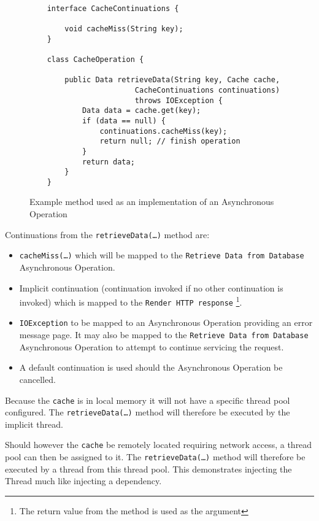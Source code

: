 \documentclass{article}
\begin{document}
\begin{figure}[!t]
\begin{verbatim}

    interface CacheContinuations {

        void cacheMiss(String key);
    }

    class CacheOperation {
    
        public Data retrieveData(String key, Cache cache, 
                        CacheContinuations continuations)
                        throws IOException {
        	Data data = cache.get(key);
        	if (data == null) {
        	    continuations.cacheMiss(key);
        	    return null; // finish operation
        	}
        	return data;
        }
    }
\end{verbatim}
\caption[Caption for Code]{Example method used as an implementation of an Asynchronous Operation}
\label{fig:Example_Method_Operation}
\end{figure}

Continuations from the \texttt{retrieveData(\ldots)} method are:
\begin{itemize}
  \item \texttt{cacheMiss(\ldots)} which will be mapped to the \texttt{Retrieve Data from Database} Asynchronous Operation.
  \item Implicit continuation (continuation invoked if no other continuation is invoked) which is mapped to the \texttt{Render HTTP response} \footnote{The return value from the method is used as the argument}.
  \item \texttt{IOException} to be mapped to an Asynchronous Operation providing an error message page.  It may also be mapped to the \texttt{Retrieve Data from Database} Asynchronous Operation to attempt to continue servicing the request.
  \item A default continuation is used should the Asynchronous Operation be cancelled.
\end{itemize}

Because the \texttt{cache} is in local memory it will not have a specific thread
pool configured.  The \texttt{retrieveData(\ldots)} method will therefore be
executed by the implicit thread.

Should however the \texttt{cache} be remotely located requiring network access,
a thread pool can then be assigned to it.  The \texttt{retrieveData(\ldots)}
method will therefore be executed by a thread from this thread pool.  This
demonstrates injecting the Thread much like injecting a dependency.
\end{document}
